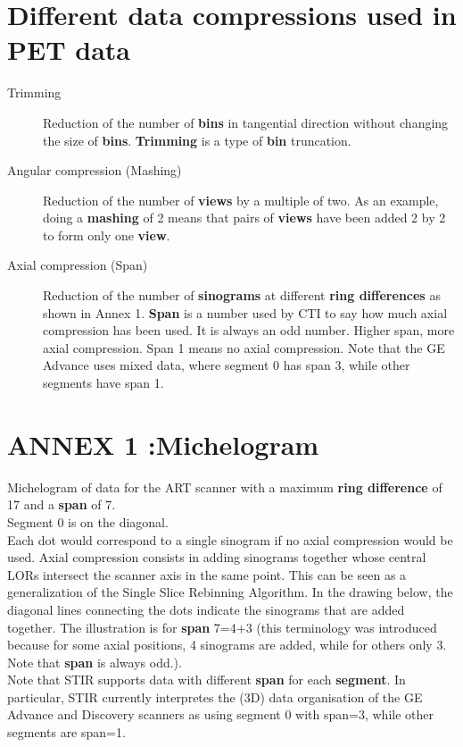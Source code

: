 \documentclass{article}
\begin{document}
\section*{Different data compressions used in PET data}
\begin{description}
\item[Trimming] 
Reduction of the number of \textbf{bins} in tangential direction without 
changing the size of \textbf{bins}. \textbf{Trimming} is a type of \textbf{bin} 
truncation.
\item[Angular compression (Mashing)] 
Reduction of the number of \textbf{views} by a multiple of two. As 
an example, doing a \textbf{mashing} of 2 means that pairs of \textbf{views} 
have been added 2 by 2 to form only one \textbf{view}.
\item[Axial compression (Span)] 
Reduction of the number of \textbf{sinograms} at different \textbf{ring 
differences} as shown in Annex 1. \textbf{Span} is a number used by 
CTI to say how much axial compression has been used. It is always 
an odd number. Higher span, more axial compression. Span 1 means 
no axial compression. Note that the GE Advance uses mixed data, 
where segment 0 has span 3, while other segments have span 1.
\end{description}




\newpage
 \section*{ ANNEX 1 :Michelogram}

Michelogram of data for the ART scanner with a maximum \textbf{ring 
difference} of 17 and a \textbf{span} of 7. \\
Segment 0 is on the diagonal. \\
Each dot would correspond to a single sinogram if no axial compression 
would be used. Axial compression consists in adding sinograms 
together whose central LORs intersect the scanner axis 
in the same point. This can be seen as a generalization of the 
Single Slice Rebinning Algorithm. In the drawing below, the diagonal 
lines connecting the dots indicate the sinograms that are added 
together. The illustration is for \textbf{span} 7=4+3 (this terminology 
was introduced because for some axial positions, 4 sinograms 
are added, while for others only 3. Note that \textbf{span} is always 
odd.).\\
Note that STIR supports data with different \textbf{span} for each \textbf{segment}. 
In particular, STIR currently interpretes the (3D) data organisation of the
GE Advance and Discovery scanners as using segment 0 with span=3, while 
other segments are span=1.
\end{document}
